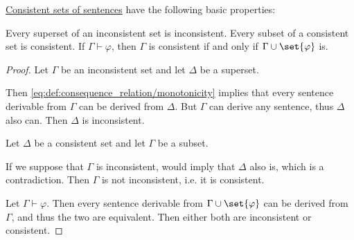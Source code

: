 \begin{proposition}\label{thm:def:consistent_set_of_sentences}
  \hyperref[def:consistent_set_of_sentences]{Consistent sets of sentences} have the following basic properties:
  \begin{thmenum}
     Every superset of an inconsistent set is inconsistent.
     Every subset of a consistent set is consistent.
     If \( \Gamma \vdash \varphi \), then \( \Gamma \) is consistent if and only if \( \Gamma \cup \set{ \varphi } \) is.
  \end{thmenum}
\end{proposition}
\begin{proof}
   Let \( \Gamma \) be an inconsistent set and let \( \Delta \) be a superset.

  Then \eqref{eq:def:consequence_relation/monotonicity} implies that every sentence derivable from \( \Gamma \) can be derived from \( \Delta \). But \( \Gamma \) can derive any sentence, thus \( \Delta \) also can. Then \( \Delta \) is inconsistent.

   Let \( \Delta \) be a consistent set and let \( \Gamma \) be a subset.

  If we suppose that \( \Gamma \) is inconsistent,  would imply that \( \Delta \) also is, which is a contradiction. Then \( \Gamma \) is not inconsistent, i.e. it is consistent.

   Let \( \Gamma \vdash \varphi \). Then every sentence derivable from \( \Gamma \cup \set{ \varphi } \) can be derived from \( \Gamma \), and thus the two are equivalent. Then either both are inconsistent or consistent.
\end{proof}

